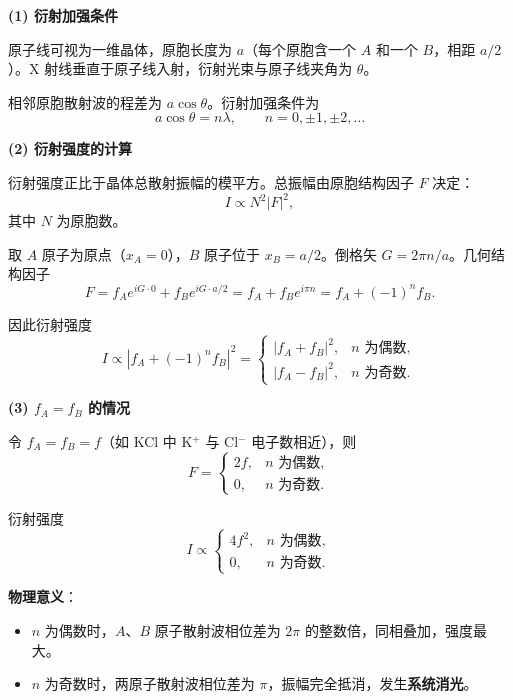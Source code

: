\begin{derivationbox}[标准解题过程]
\textbf{(1) 衍射加强条件}

原子线可视为一维晶体，原胞长度为 $a$（每个原胞含一个 $A$ 和一个 $B$，相距 $a/2$）。X 射线垂直于原子线入射，衍射光束与原子线夹角为 $\theta$。

相邻原胞散射波的程差为 $a\cos\theta$。衍射加强条件为
\begin{equation}
\boxed{a\cos\theta=n\lambda,\qquad n=0,\pm1,\pm2,\ldots}
\end{equation}

\textbf{(2) 衍射强度的计算}

衍射强度正比于晶体总散射振幅的模平方。总振幅由原胞结构因子 $F$ 决定：
\begin{equation}
I\propto N^2|F|^2,
\end{equation}
其中 $N$ 为原胞数。

取 $A$ 原子为原点（$x_A=0$），$B$ 原子位于 $x_B=a/2$。倒格矢 $G=2\pi n/a$。几何结构因子
\begin{equation}
F=f_Ae^{iG\cdot0}+f_Be^{iG\cdot a/2}
=f_A+f_Be^{i\pi n}
=f_A+(-1)^nf_B.
\end{equation}

因此衍射强度
\begin{equation}
\boxed{I\propto|f_A+(-1)^nf_B|^2=}
\begin{cases}
|f_A+f_B|^2, & n\text{ 为偶数},\\
|f_A-f_B|^2, & n\text{ 为奇数}.
\end{cases}
\end{equation}

\textbf{(3) $f_A=f_B$ 的情况}

令 $f_A=f_B=f$（如 KCl 中 K$^+$ 与 Cl$^-$ 电子数相近），则
\begin{equation}
F=\begin{cases}2f, & n\text{ 为偶数},\\0, & n\text{ 为奇数}.\end{cases}
\end{equation}

衍射强度
\begin{equation}
\boxed{I\propto\begin{cases}4f^2, & n\text{ 为偶数},\\0, & n\text{ 为奇数}.\end{cases}}
\end{equation}

\textbf{物理意义}：
\begin{itemize}
    \item $n$ 为偶数时，$A$、$B$ 原子散射波相位差为 $2\pi$ 的整数倍，同相叠加，强度最大。
    \item $n$ 为奇数时，两原子散射波相位差为 $\pi$，振幅完全抵消，发生\textbf{系统消光}。
\end{itemize}
\end{derivationbox}

